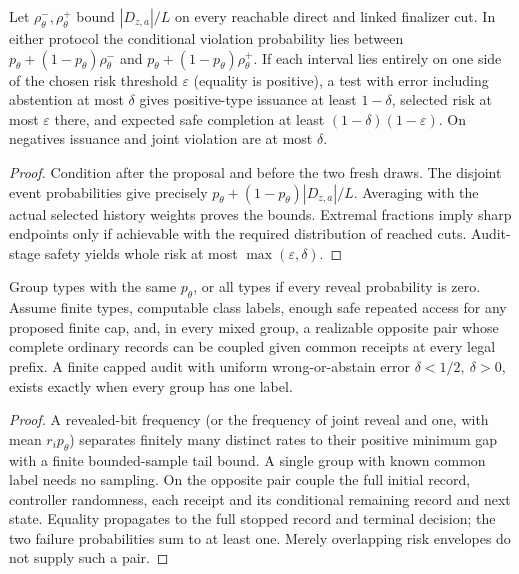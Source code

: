 \begin{theorem}\label{flag:a1}
Let \(\rho_\theta^-,\rho_\theta^+\) bound \(|D_{z,a}|/L\) on every reachable direct and linked finalizer cut. In either protocol the conditional violation probability lies between \(p_\theta+(1-p_\theta)\rho_\theta^-\) and \(p_\theta+(1-p_\theta)\rho_\theta^+\). If each interval lies entirely on one side of the chosen risk threshold \(\varepsilon\) (equality is positive), a test with error including abstention at most \(\delta\) gives positive-type issuance at least \(1-\delta\), selected risk at most \(\varepsilon\) there, and expected safe completion at least \((1-\delta)(1-\varepsilon)\). On negatives issuance and joint violation are at most \(\delta\).
\end{theorem}
\begin{proof}
Condition after the proposal and before the two fresh draws. The disjoint event probabilities give precisely \(p_\theta+(1-p_\theta)|D_{z,a}|/L\). Averaging with the actual selected history weights proves the bounds. Extremal fractions imply sharp endpoints only if achievable with the required distribution of reached cuts. Audit-stage safety yields whole risk at most \(\max(\varepsilon,\delta)\).
\end{proof}

\begin{theorem}\label{flag:a2}
Group types with the same \(p_\theta\), or all types if every reveal probability is zero. Assume finite types, computable class labels, enough safe repeated access for any proposed finite cap, and, in every mixed group, a realizable opposite pair whose complete ordinary records can be coupled given common receipts at every legal prefix. A finite capped audit with uniform wrong-or-abstain error \(\delta<1/2,\ \delta>0\), exists exactly when every group has one label.
\end{theorem}
\begin{proof}
A revealed-bit frequency (or the frequency of joint reveal and one, with mean \(r_i p_\theta\)) separates finitely many distinct rates to their positive minimum gap with a finite bounded-sample tail bound. A single group with known common label needs no sampling. On the opposite pair couple the full initial record, controller randomness, each receipt and its conditional remaining record and next state. Equality propagates to the full stopped record and terminal decision; the two failure probabilities sum to at least one. Merely overlapping risk envelopes do not supply such a pair.
\end{proof}

